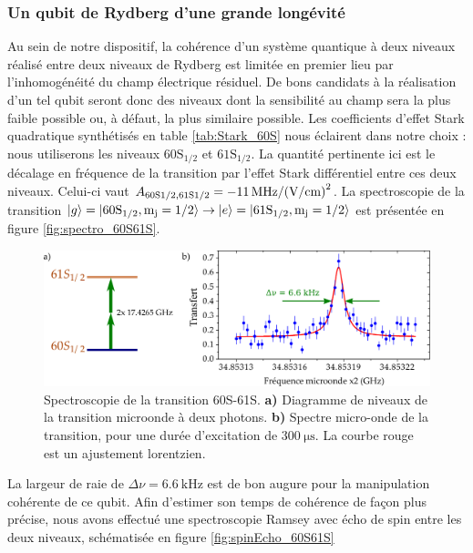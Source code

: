 \subsubsection*{Un qubit de Rydberg d'une grande longévité}
\noindent Au sein de notre dispositif, la cohérence d'un système quantique à deux niveaux réalisé entre deux niveaux de Rydberg est limitée en premier lieu par l'inhomogénéité du champ électrique résiduel.
De bons candidats à la réalisation d'un tel qubit seront donc des niveaux dont la sensibilité au champ sera la plus faible possible ou, à défaut, la plus similaire possible.
Les coefficients d'effet Stark quadratique synthétisés en table \eqref{tab:Stark_60S} nous éclairent dans notre choix : nous utiliserons les niveaux $\mathrm{60S_{1/2}}$ et $\mathrm{61S_{1/2}}$.
La quantité pertinente ici est le décalage en fréquence de la transition par l'effet Stark différentiel entre ces deux niveaux.
Celui-ci vaut $A_{\mathrm{60S1/2,61S1/2}} = \SI{-11}{\MHz \per (\V \per\cm) \squared}$.
La spectroscopie de la transition $\ket{g}=\ket{\mathrm{60S_{1/2},m_j=1/2}} \rightarrow \ket{e}=\ket{\mathrm{61S_{1/2},m_j=1/2}}$ est présentée en figure \eqref{fig:spectro_60S61S}.
%
\begin{figure}[h]
\centering
\vspace{1em}
\includegraphics[width=.8\linewidth]{figures/setup/rydberg/spectro_60S61S}
\caption[Spectroscopie de la transition 60S-61S]{
Spectroscopie de la transition 60S-61S.
\textbf{a)} Diagramme de niveaux de la transition microonde à deux photons.
\textbf{b)} Spectre micro-onde de la transition, pour une durée d'excitation de $\SI{300}{\us}$. La courbe rouge est un ajustement lorentzien.
}
\label{fig:spectro_60S61S}
\end{figure}
%
La largeur de raie de $\Delta\nu=\SI{6.6}{\kHz}$ est de bon augure pour la manipulation cohérente de ce qubit.
Afin d'estimer son temps de cohérence de façon plus précise, nous avons effectué une spectroscopie Ramsey avec écho de spin entre les deux niveaux, schématisée en figure \eqref{fig:spinEcho_60S61S}
%
